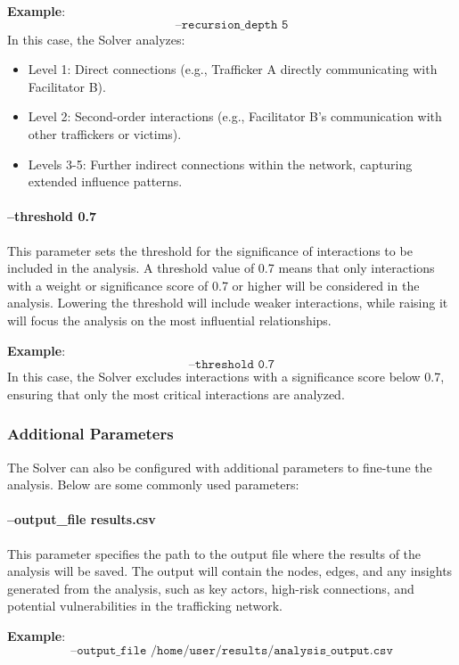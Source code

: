 \documentclass[%
 preprint, linenumbers,
 amsmath,amssymb,
 aps, physrev,
]{revtex4-2}
\begin{document}
\textbf{Example}:
\[
\texttt{--recursion\_depth 5}
\]
In this case, the Solver analyzes:
\begin{itemize}
    \item Level 1: Direct connections (e.g., Trafficker A directly communicating with Facilitator B).
    \item Level 2: Second-order interactions (e.g., Facilitator B’s communication with other traffickers or victims).
    \item Levels 3-5: Further indirect connections within the network, capturing extended influence patterns.
\end{itemize}

\paragraph{--threshold 0.7}
This parameter sets the threshold for the significance of interactions to be included in the analysis. A threshold value of 0.7 means that only interactions with a weight or significance score of 0.7 or higher will be considered in the analysis. Lowering the threshold will include weaker interactions, while raising it will focus the analysis on the most influential relationships.

\textbf{Example}:
\[
\texttt{--threshold 0.7}
\]
In this case, the Solver excludes interactions with a significance score below 0.7, ensuring that only the most critical interactions are analyzed.

\subsubsection{Additional Parameters}

The Solver can also be configured with additional parameters to fine-tune the analysis. Below are some commonly used parameters:

\paragraph{--output\_file results.csv}
This parameter specifies the path to the output file where the results of the analysis will be saved. The output will contain the nodes, edges, and any insights generated from the analysis, such as key actors, high-risk connections, and potential vulnerabilities in the trafficking network.

\textbf{Example}:
\[
\texttt{--output\_file /home/user/results/analysis\_output.csv}
\]
\end{document}

